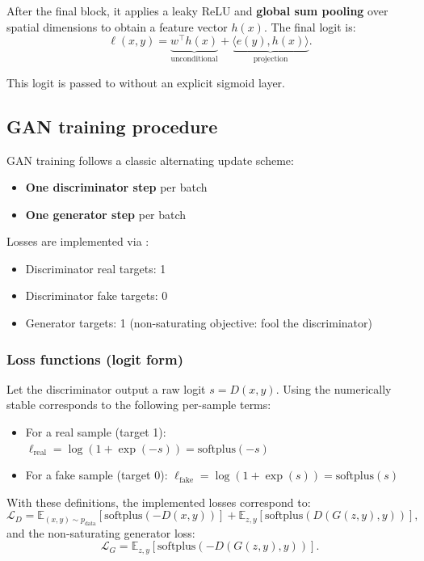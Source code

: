 After the final block, it applies a leaky ReLU and \textbf{global sum pooling} over spatial dimensions to obtain a feature vector \(h(x)\). The final logit is:
\[
\ell(x, y) = \underbrace{w^\top h(x)}_{\text{unconditional}} + \underbrace{\langle e(y), h(x) \rangle}_{\text{projection}}.
\]

This logit is passed to  without an explicit sigmoid layer.

\subsection{GAN training procedure}

GAN training follows a classic alternating update scheme:
\begin{itemize}
\item \textbf{One discriminator step} per batch
\item \textbf{One generator step} per batch
\end{itemize}

Losses are implemented via :
\begin{itemize}
\item Discriminator real targets: 1
\item Discriminator fake targets: 0
\item Generator targets: 1 (non-saturating objective: fool the discriminator)
\end{itemize}

\subsubsection{Loss functions (logit form)}

Let the discriminator output a raw logit \(s = D(x, y)\). Using the numerically stable  corresponds to the following per-sample terms:
\begin{itemize}
\item For a real sample (target 1): \(\ell_{\text{real}} = \log(1 + \exp(-s)) = \mathrm{softplus}(-s)\)
\item For a fake sample (target 0): \(\ell_{\text{fake}} = \log(1 + \exp(s)) = \mathrm{softplus}(s)\)
\end{itemize}

With these definitions, the implemented losses correspond to:
\[
\mathcal{L}_D = \mathbb{E}_{(x,y)\sim p_{\text{data}}}\left[\mathrm{softplus}(-D(x,y))\right] + \mathbb{E}_{z,y}\left[\mathrm{softplus}(D(G(z,y),y))\right],
\]
and the non-saturating generator loss:
\[
\mathcal{L}_G = \mathbb{E}_{z,y}\left[\mathrm{softplus}(-D(G(z,y),y))\right].
\]

